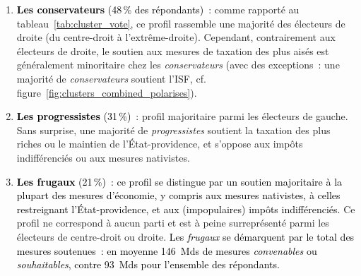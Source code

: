 \documentclass[12pt,french]{article}
\newcommand{\blue}[1]{\textcolor{black}{#1}} %
\begin{document}
\begin{enumerate}
  \item \blue{\textbf{Les conservateurs} (48\,\% des répondants)}~: comme rapporté au tableau~\ref{tab:cluster_vote}, ce profil rassemble une majorité des électeurs de droite (du centre-droit à l'extrême-droite). Cependant, contrairement aux électeurs de droite, le soutien aux mesures de taxation des plus aisés est généralement minoritaire chez les \textit{conservateurs} (avec des exceptions~: une majorité de \textit{conservateurs} soutient l'ISF, cf. figure~\ref{fig:clusters_combined_polarises}).   
  \item \blue{\textbf{Les progressistes} (31\,\%)}~: profil majoritaire parmi les électeurs de gauche. %
  Sans surprise, une majorité de \textit{progressistes} soutient la taxation des plus riches ou le maintien de l'État-providence, et s'oppose aux impôts indifférenciés ou aux mesures nativistes. %
  \item \blue{\textbf{Les frugaux} (21\,\%)~: ce profil se distingue par un soutien majoritaire à la plupart des mesures d'économie, y compris aux mesures nativistes, à celles restreignant l'État-providence, et aux (impopulaires) impôts indifférenciés.} Ce profil ne correspond à aucun parti et est à peine surreprésenté parmi les électeurs de centre-droit ou droite. \blue{Les \textit{frugaux} se démarquent par le total des mesures soutenues~: %
  en moyenne 146~Mds de mesures \textit{convenables} ou \textit{souhaitables}, contre 93~Mds pour l'ensemble des répondants.} 
\end{enumerate}

\begin{table}[htbp]
  \centering
  \caption{Profils de répondants par bloc politique dans les partitionnements \texttt{budget}.} 
  \label{tab:cluster_vote}
  
\end{table}
\end{document}

